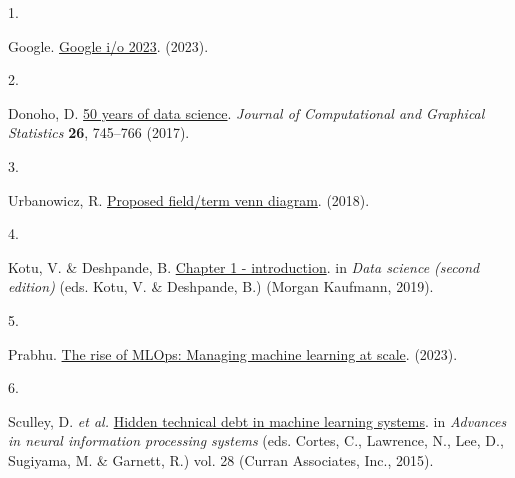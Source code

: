 \documentclass[
  paper=6in:9in,
  pagesize=pdftex,
  headinclude=on,
  footinclude=on,
  12pt]{scrbook}
\newlength{\cslhangindent}
\newlength{\csllabelwidth}
\newenvironment{CSLReferences}[2] %
 {\begin{list}{}{%
  \setlength{\itemindent}{0pt}
  \setlength{\leftmargin}{0pt}
  \setlength{\parsep}{0pt}
  \ifodd #1
   \setlength{\leftmargin}{\cslhangindent}
   \setlength{\itemindent}{-1\cslhangindent}
  \fi
  \setlength{\itemsep}{#2\baselineskip}}}
 {\end{list}}
\newcommand{\CSLLeftMargin}[1]{\parbox[t]{\csllabelwidth}{\strut#1\strut}}
\newcommand{\CSLRightInline}[1]{\parbox[t]{\linewidth - \csllabelwidth}{\strut#1\strut}}
\begin{document}
\label{refs}
\begin{CSLReferences}{0}{0}
\CSLLeftMargin{1. }%
\CSLRightInline{Google.
\href{https://www.youtube.com/watch?v=QpBTM0GO6xI&list=TLGGCy91ScdjTPYwNTEyMjAyMw}{Google
i/o 2023}. (2023).}

\CSLLeftMargin{2. }%
\CSLRightInline{Donoho, D.
\href{https://doi.org/10.1080/10618600.2017.1384734}{50 years of data
science}. \emph{Journal of Computational and Graphical Statistics}
\textbf{26}, 745--766 (2017).}

\CSLLeftMargin{3. }%
\CSLRightInline{Urbanowicz, R.
\href{https://twitter.com/DocUrbs/status/1007375834347376642?lang=en}{Proposed
field/term venn diagram}. (2018).}

\CSLLeftMargin{4. }%
\CSLRightInline{Kotu, V. \& Deshpande, B.
\href{https://www.sciencedirect.com/science/article/pii/B9780128147610000010}{Chapter
1 - introduction}. in \emph{Data science (second edition)} (eds. Kotu,
V. \& Deshpande, B.) (Morgan Kaufmann, 2019).}

\CSLLeftMargin{5. }%
\CSLRightInline{Prabhu.
\href{https://medium.com/aimonks/the-rise-of-mlops-managing-machine-learning-at-scale-e31ea4a0039f}{The
rise of MLOps: Managing machine learning at scale}. (2023).}

\CSLLeftMargin{6. }%
\CSLRightInline{Sculley, D. \emph{et al.}
\href{https://proceedings.neurips.cc/paper_files/paper/2015/file/86df7dcfd896fcaf2674f757a2463eba-Paper.pdf}{Hidden
technical debt in machine learning systems}. in \emph{Advances in neural
information processing systems} (eds. Cortes, C., Lawrence, N., Lee, D.,
Sugiyama, M. \& Garnett, R.) vol. 28 (Curran Associates, Inc., 2015).}

\end{CSLReferences}


\backmatter
\end{document}
